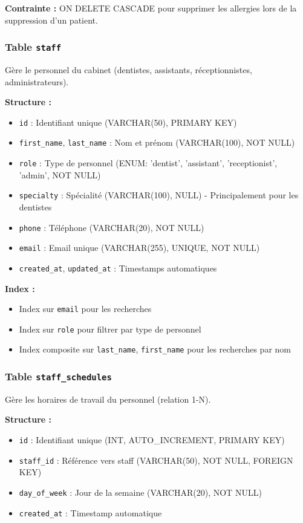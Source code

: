 \documentclass[12pt,a4paper]{report}
\begin{document}
\textbf{Contrainte :} ON DELETE CASCADE pour supprimer les allergies lors de la suppression d'un patient.

\subsubsection{Table \texttt{staff}}

Gère le personnel du cabinet (dentistes, assistants, réceptionnistes, administrateurs).

\textbf{Structure :}
\begin{itemize}
    \item \texttt{id} : Identifiant unique (VARCHAR(50), PRIMARY KEY)
    \item \texttt{first\_name}, \texttt{last\_name} : Nom et prénom (VARCHAR(100), NOT NULL)
    \item \texttt{role} : Type de personnel (ENUM: 'dentist', 'assistant', 'receptionist', 'admin', NOT NULL)
    \item \texttt{specialty} : Spécialité (VARCHAR(100), NULL) - Principalement pour les dentistes
    \item \texttt{phone} : Téléphone (VARCHAR(20), NOT NULL)
    \item \texttt{email} : Email unique (VARCHAR(255), UNIQUE, NOT NULL)
    \item \texttt{created\_at}, \texttt{updated\_at} : Timestamps automatiques
\end{itemize}

\textbf{Index :}
\begin{itemize}
    \item Index sur \texttt{email} pour les recherches
    \item Index sur \texttt{role} pour filtrer par type de personnel
    \item Index composite sur \texttt{last\_name}, \texttt{first\_name} pour les recherches par nom
\end{itemize}

\subsubsection{Table \texttt{staff\_schedules}}

Gère les horaires de travail du personnel (relation 1-N).

\textbf{Structure :}
\begin{itemize}
    \item \texttt{id} : Identifiant unique (INT, AUTO\_INCREMENT, PRIMARY KEY)
    \item \texttt{staff\_id} : Référence vers staff (VARCHAR(50), NOT NULL, FOREIGN KEY)
    \item \texttt{day\_of\_week} : Jour de la semaine (VARCHAR(20), NOT NULL)
    \item \texttt{created\_at} : Timestamp automatique
\end{itemize}
\end{document}
